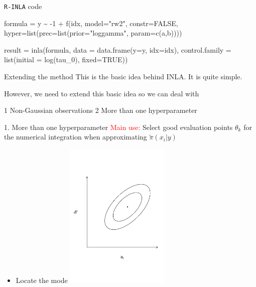 \documentclass[
  ignorenonframetext,
]{beamer}
\newenvironment{Shaded}{\begin{snugshade}}{\end{snugshade}}
\newcommand{\AttributeTok}[1]{\textcolor[rgb]{0.77,0.63,0.00}{#1}}
\newcommand{\ConstantTok}[1]{\textcolor[rgb]{0.00,0.00,0.00}{#1}}
\newcommand{\DecValTok}[1]{\textcolor[rgb]{0.00,0.00,0.81}{#1}}
\newcommand{\FunctionTok}[1]{\textcolor[rgb]{0.00,0.00,0.00}{#1}}
\newcommand{\NormalTok}[1]{#1}
\newcommand{\OtherTok}[1]{\textcolor[rgb]{0.56,0.35,0.01}{#1}}
\newcommand{\SpecialCharTok}[1]{\textcolor[rgb]{0.00,0.00,0.00}{#1}}
\newcommand{\StringTok}[1]{\textcolor[rgb]{0.31,0.60,0.02}{#1}}
\providecommand{\tightlist}{%
  \setlength{\itemsep}{0pt}\setlength{\parskip}{0pt}}
\begin{document}
\begin{frame}[fragile]{\texttt{R-INLA} code}
\protect\hypertarget{r-inla-code}{}
\small

\begin{Shaded}
\begin{Highlighting}[]
\NormalTok{formula }\OtherTok{=}\NormalTok{ y }\SpecialCharTok{\textasciitilde{}} \SpecialCharTok{{-}}\DecValTok{1} \SpecialCharTok{+} \FunctionTok{f}\NormalTok{(idx, }\AttributeTok{model=}\StringTok{"rw2"}\NormalTok{, }\AttributeTok{constr=}\ConstantTok{FALSE}\NormalTok{,}
   \AttributeTok{hyper=}\FunctionTok{list}\NormalTok{(}\AttributeTok{prec=}\FunctionTok{list}\NormalTok{(}\AttributeTok{prior=}\StringTok{"loggamma"}\NormalTok{, }\AttributeTok{param=}\FunctionTok{c}\NormalTok{(a,b))))}

\NormalTok{result }\OtherTok{=} \FunctionTok{inla}\NormalTok{(formula,}
      \AttributeTok{data =} \FunctionTok{data.frame}\NormalTok{(}\AttributeTok{y=}\NormalTok{y, }\AttributeTok{idx=}\NormalTok{idx),}
      \AttributeTok{control.family =} \FunctionTok{list}\NormalTok{(}\AttributeTok{initial =} \FunctionTok{log}\NormalTok{(tau\_0), }\AttributeTok{fixed=}\ConstantTok{TRUE}\NormalTok{))}
\end{Highlighting}
\end{Shaded}

\normalsize
\end{frame}

\begin{frame}{Extending the method}
\protect\hypertarget{extending-the-method}{}
This is the basic idea behind INLA. It is quite simple.

However, we need to extend this basic idea so we can deal with

1 Non-Gaussian observations 2 More than one hyperparameter
\end{frame}

\begin{frame}{1. More than one hyperparameter}
\protect\hypertarget{more-than-one-hyperparameter}{}
\textcolor{red}{Main use:} Select good evaluation points \({\theta}_k\)
for the numerical integration when approximating
\(\widetilde{\pi}(x_i|{y})\)

\begin{itemize}
\tightlist
\item
  Locate the mode \includegraphics[width=5cm]{./graphics/ellipse1}
\end{itemize}
\end{frame}
\end{document}
